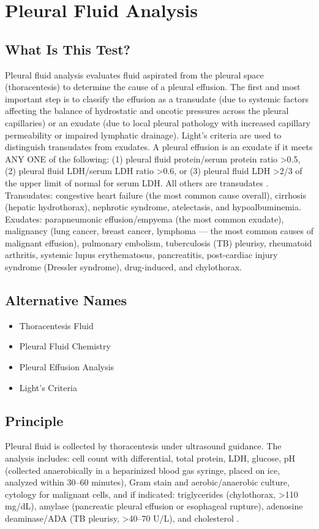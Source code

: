 \chapter{Pleural Fluid Analysis}
\section*{What Is This Test?}
Pleural fluid analysis evaluates fluid aspirated from the pleural space (thoracentesis) to determine the cause of a pleural effusion. The first and most important step is to classify the effusion as a transudate (due to systemic factors affecting the balance of hydrostatic and oncotic pressures across the pleural capillaries) or an exudate (due to local pleural pathology with increased capillary permeability or impaired lymphatic drainage). Light's criteria are used to distinguish transudates from exudates. A pleural effusion is an exudate if it meets ANY ONE of the following: (1) pleural fluid protein/serum protein ratio >0.5, (2) pleural fluid LDH/serum LDH ratio >0.6, or (3) pleural fluid LDH >2/3 of the upper limit of normal for serum LDH. All others are transudates \cite{light1972pleural}. Transudates: congestive heart failure (the most common cause overall), cirrhosis (hepatic hydrothorax), nephrotic syndrome, atelectasis, and hypoalbuminemia. Exudates: parapneumonic effusion/empyema (the most common exudate), malignancy (lung cancer, breast cancer, lymphoma --- the most common causes of malignant effusion), pulmonary embolism, tuberculosis (TB) pleurisy, rheumatoid arthritis, systemic lupus erythematosus, pancreatitis, post-cardiac injury syndrome (Dressler syndrome), drug-induced, and chylothorax.
\section*{Alternative Names}
\begin{itemize}
  \item Thoracentesis Fluid
  \item Pleural Fluid Chemistry
  \item Pleural Effusion Analysis
  \item Light's Criteria
\end{itemize}
\section*{Principle}
Pleural fluid is collected by thoracentesis under ultrasound guidance. The analysis includes: cell count with differential, total protein, LDH, glucose, pH (collected anaerobically in a heparinized blood gas syringe, placed on ice, analyzed within 30--60 minutes), Gram stain and aerobic/anaerobic culture, cytology for malignant cells, and if indicated: triglycerides (chylothorax, >110 mg/dL), amylase (pancreatic pleural effusion or esophageal rupture), adenosine deaminase/ADA (TB pleurisy, >40--70 U/L), and cholesterol \cite{light2013pleural}.

